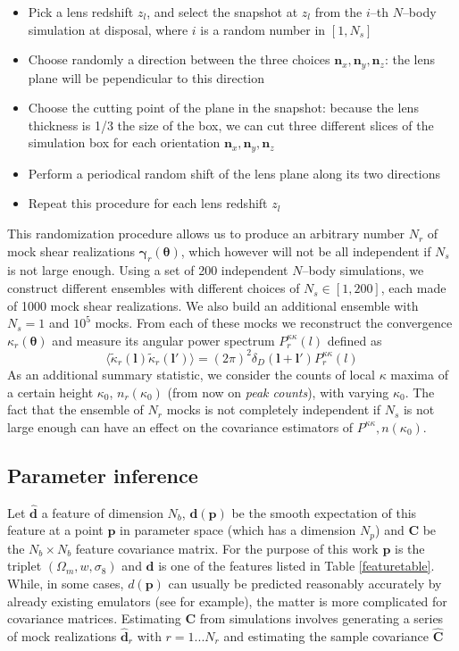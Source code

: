 \documentclass[reprint,aps,prd,superscriptaddress,showkeys,showpacs]{revtex4-1}
\newcommand{\bb}[1]{\mathbf{#1}}
\newcommand{\bbh}[1]{\mathbf{\hat{#1}}}
\begin{document}
\begin{itemize}
\item Pick a lens redshift $z_l$, and select the snapshot at $z_l$ from the $i$--th $N$--body simulation at disposal, where $i$ is a random number in $[1,N_s]$
\item Choose randomly a direction between the three choices ${\bb{n}_x,\bb{n}_y,\bb{n}_z}$: the lens plane will be pependicular to this direction
\item Choose the cutting point of the plane in the snapshot: because the lens thickness is 1/3 the size of the box, we can cut three different slices of the simulation box for each orientation ${\bb{n}_x,\bb{n}_y,\bb{n}_z}$
\item Perform a periodical random shift of the lens plane along its two directions
\item Repeat this procedure for each lens redshift $z_l$  
\end{itemize}  
%
This randomization procedure allows us to produce an arbitrary number $N_r$ of mock shear realizations $\pmb{\gamma}_r(\pmb{\theta})$, which however will not be all independent if $N_s$ is not large enough. Using a set of 200 independent $N$--body simulations, we construct different ensembles with different choices of $N_s\in[1,200]$, each made of 1000 mock shear realizations. We also build an additional ensemble with $N_s=1$ and $10^5$ mocks. From each of these mocks we reconstruct the convergence $\kappa_r(\pmb{\theta})$ and measure its angular power spectrum $P^{\kappa\kappa}_r(l)$ defined as
\begin{equation}
\langle\tilde{\kappa}_r(\bb{l})\tilde{\kappa}_r(\bb{l}')\rangle = (2\pi)^2\delta_D(\bb{l}+\bb{l}')P^{\kappa\kappa}_r(l)
\end{equation}
%
As an additional summary statistic, we consider the counts of local $\kappa$ maxima of a certain height $\kappa_0$, $n_r(\kappa_0)$ (from now on \textit{peak counts}), with varying $\kappa_0$. The fact that the ensemble of $N_r$ mocks is not completely independent if $N_s$ is not large enough can have an effect on the covariance estimators of $P^{\kappa\kappa},n(\kappa_0)$. 


\subsection{Parameter inference}
%
Let $\bbh{d}$ a feature of dimension $N_b$, $\bb{d}(\bb{p})$ be the smooth expectation of this feature at a point $\bb{p}$ in parameter space (which has a dimension $N_p$) and $\bb{C}$ be the $N_b\times N_b$ feature covariance matrix. For the purpose of this work $\bb{p}$ is the triplet $(\Omega_m,w,\sigma_8)$ and $\bb{d}$ is one of the features listed in Table \ref{featuretable}. While, in some cases, $d(\bb{p})$ can usually be predicted reasonably accurately by already existing emulators (see \citep{coyote2,Nicaea} for example), the matter is more complicated for covariance matrices. Estimating $\bb{C}$ from simulations involves generating a series of mock realizations $\bbh{d}_r$ with $r=1...N_r$ and estimating the sample covariance $\bbh{C}$
\end{document}
